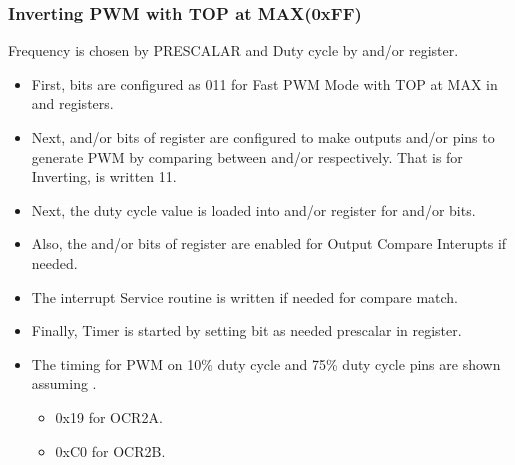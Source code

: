 \subsubsection{Inverting PWM with TOP at MAX(0xFF)}
\quad Frequency is chosen by PRESCALAR and Duty cycle by  and/or  register.
\begin{itemize}
    \item First,  bits are configured as 011 for Fast PWM Mode with TOP at MAX in  and  registers.
    \item Next,  and/or  bits of  register are configured to make outputs  and/or  pins to generate PWM by comparing between  and/or  respectively. That is for Inverting,  is written 11.
    \item Next, the duty cycle value is loaded into  and/or  register for  and/or  bits.
    \item Also, the  and/or  bits of  register  are enabled for Output Compare Interupts if needed.
    \item The interrupt Service routine is written if needed for compare match.
    \item Finally, Timer is started by setting  bit as needed prescalar in  register.
    \item The timing for PWM on 10\% duty cycle  and 75\% duty cycle  pins are shown assuming .
    \begin{itemize}
        \item 0x19 for OCR2A.
        \item 0xC0 for OCR2B.
    \end{itemize}
\end{itemize}

